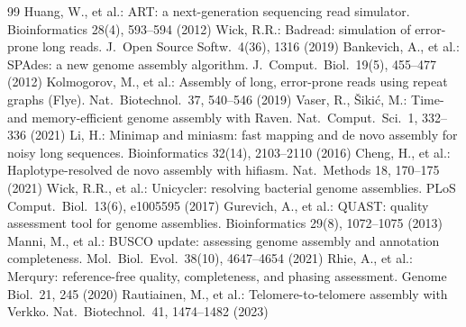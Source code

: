 \documentclass[runningheads]{llncs}
\begin{document}
\begin{thebibliography}{99}
 Huang, W., et al.: ART: a next-generation sequencing read simulator. Bioinformatics 28(4), 593--594 (2012)
 Wick, R.R.: Badread: simulation of error-prone long reads. J.\ Open Source Softw.\ 4(36), 1316 (2019)
 Bankevich, A., et al.: SPAdes: a new genome assembly algorithm. J.\ Comput.\ Biol.\ 19(5), 455--477 (2012)
 Kolmogorov, M., et al.: Assembly of long, error-prone reads using repeat graphs (Flye). Nat.\ Biotechnol.\ 37, 540--546 (2019)
 Vaser, R., \v{S}iki\'c, M.: Time- and memory-efficient genome assembly with Raven. Nat.\ Comput.\ Sci.\ 1, 332--336 (2021)
 Li, H.: Minimap and miniasm: fast mapping and de novo assembly for noisy long sequences. Bioinformatics 32(14), 2103--2110 (2016)
 Cheng, H., et al.: Haplotype-resolved de novo assembly with hifiasm. Nat.\ Methods 18, 170--175 (2021)
 Wick, R.R., et al.: Unicycler: resolving bacterial genome assemblies. PLoS Comput.\ Biol.\ 13(6), e1005595 (2017)
 Gurevich, A., et al.: QUAST: quality assessment tool for genome assemblies. Bioinformatics 29(8), 1072--1075 (2013)
 Manni, M., et al.: BUSCO update: assessing genome assembly and annotation completeness. Mol.\ Biol.\ Evol.\ 38(10), 4647--4654 (2021)
 Rhie, A., et al.: Merqury: reference-free quality, completeness, and phasing assessment. Genome Biol.\ 21, 245 (2020)
 Rautiainen, M., et al.: Telomere-to-telomere assembly with Verkko. Nat.\ Biotechnol.\ 41, 1474--1482 (2023)
\end{thebibliography}
\end{document}
